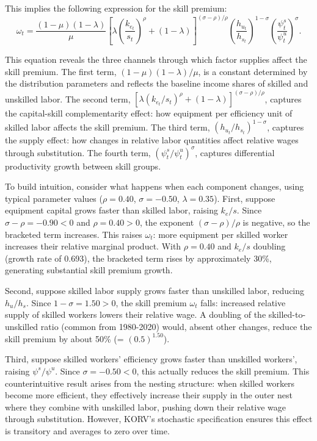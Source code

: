 \documentclass[12pt]{article}
\begin{document}
This implies the following expression for the skill premium:
\begin{equation}\label{eq:skill_premium}
 \omega_{t}=\frac{(1-\mu)(1-\lambda)}{\mu}\left[\lambda\left(\frac{k_{e_t}}{s_{t}}\right)^{\rho}+(1-\lambda)\right]^{(\sigma-\rho) / \rho}\left(\frac{h_{u_t}}{h_{s_t}}\right)^{1-\sigma}\left(\frac{\psi^s_t}{\psi^u_t}\right)^{\sigma} .
\end{equation}

This equation reveals the three channels through which factor supplies affect the skill premium. The first term, $(1-\mu)(1-\lambda)/\mu$, is a constant determined by the distribution parameters and reflects the baseline income shares of skilled and unskilled labor. The second term, $[\lambda(k_{e_t}/s_t)^\rho + (1-\lambda)]^{(\sigma-\rho)/\rho}$, captures the capital-skill complementarity effect: how equipment per efficiency unit of skilled labor affects the skill premium. The third term, $(h_{u_t}/h_{s_t})^{1-\sigma}$, captures the supply effect: how changes in relative labor quantities affect relative wages through substitution. The fourth term, $(\psi^s_t/\psi^u_t)^\sigma$, captures differential productivity growth between skill groups.

To build intuition, consider what happens when each component changes, using typical parameter values ($\rho = 0.40$, $\sigma = -0.50$, $\lambda = 0.35$). First, suppose equipment capital grows faster than skilled labor, raising $k_e/s$. Since $\sigma - \rho = -0.90 < 0$ and $\rho = 0.40 > 0$, the exponent $(\sigma-\rho)/\rho$ is negative, so the bracketed term increases. This raises $\omega_t$: more equipment per skilled worker increases their relative marginal product. With $\rho = 0.40$ and $k_e/s$ doubling (growth rate of 0.693), the bracketed term rises by approximately 30\%, generating substantial skill premium growth.

Second, suppose skilled labor supply grows faster than unskilled labor, reducing $h_u/h_s$. Since $1-\sigma = 1.50 > 0$, the skill premium $\omega_t$ falls: increased relative supply of skilled workers lowers their relative wage. A doubling of the skilled-to-unskilled ratio (common from 1980-2020) would, absent other changes, reduce the skill premium by about 50\% (= $(0.5)^{1.50}$).

Third, suppose skilled workers' efficiency grows faster than unskilled workers', raising $\psi^s/\psi^u$. Since $\sigma = -0.50 < 0$, this actually reduces the skill premium. This counterintuitive result arises from the nesting structure: when skilled workers become more efficient, they effectively increase their supply in the outer nest where they combine with unskilled labor, pushing down their relative wage through substitution. However, KORV's stochastic specification ensures this effect is transitory and averages to zero over time.
\end{document}
